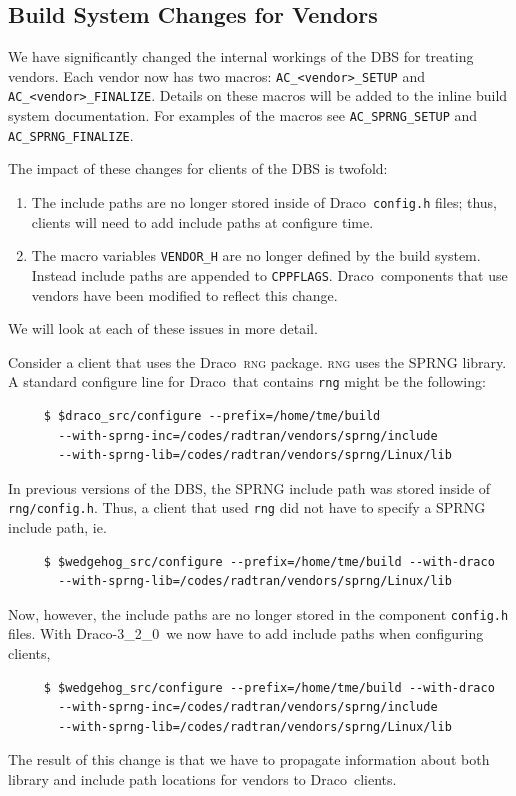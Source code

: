 \documentclass[note]{ResearchNote_pdf}
\newcommand{\draco}{Draco}
\newcommand{\dracor}{\draco-3\_2\_0}
\begin{document}
\subsection{Build System Changes for Vendors}

We have significantly changed the internal workings of the DBS for
treating vendors.  Each vendor now has two macros:
\texttt{AC\_<vendor>\_SETUP} and \texttt{AC\_<vendor>\_FINALIZE}.
Details on these macros will be added to the inline build system
documentation.  For examples of the macros see \texttt{AC\_SPRNG\_SETUP}
and \texttt{AC\_SPRNG\_FINALIZE}.  

The impact of these changes for clients of the DBS is twofold:
\begin{enumerate}
\item The include paths are no longer stored inside of \draco\
  \texttt{config.h} files; thus, clients will need to add include
  paths at configure time.
\item The macro variables \texttt{VENDOR\_H} are no longer defined by
  the build system.  Instead include paths are appended to
  \texttt{CPPFLAGS}.  \draco\ components that use vendors have been
  modified to reflect this change.
\end{enumerate}
We will look at each of these issues in more detail.

Consider a client that uses the \draco\ \textsc{rng} package.
\textsc{rng} uses the SPRNG library.  A standard configure line for
\draco\ that contains \texttt{rng} might be the following:
\begin{verbatim}
     $ $draco_src/configure --prefix=/home/tme/build 
       --with-sprng-inc=/codes/radtran/vendors/sprng/include
       --with-sprng-lib=/codes/radtran/vendors/sprng/Linux/lib
\end{verbatim}
In previous versions of the DBS, the SPRNG include path was stored
inside of \texttt{rng/config.h}.  Thus, a client that used
\texttt{rng} did not have to specify a SPRNG include path, ie.
\begin{verbatim}
     $ $wedgehog_src/configure --prefix=/home/tme/build --with-draco
       --with-sprng-lib=/codes/radtran/vendors/sprng/Linux/lib
\end{verbatim}
Now, however, the include paths are no longer stored in the component
\texttt{config.h} files.  With \dracor\ we now have to add include
paths when configuring clients,
\begin{verbatim}
     $ $wedgehog_src/configure --prefix=/home/tme/build --with-draco
       --with-sprng-inc=/codes/radtran/vendors/sprng/include
       --with-sprng-lib=/codes/radtran/vendors/sprng/Linux/lib
\end{verbatim}
The result of this change is that we have to propagate information
about both library and include path locations for vendors to \draco\
clients. 
\end{document}
